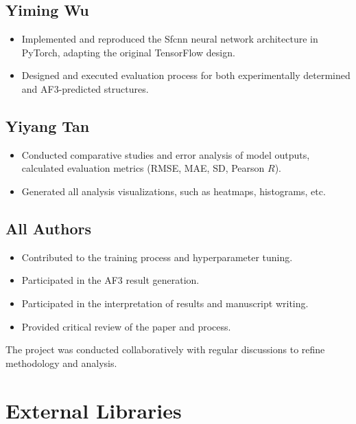 \documentclass[unnumsec,webpdf,contemporary,large]{oup-authoring-template}
\theoremstyle{thmstyleone}%
\theoremstyle{thmstyletwo}%
\theoremstyle{thmstylethree}%
\begin{document}
\subsection{Yiming Wu}
\begin{itemize}
    \item Implemented and reproduced the Sfcnn neural network architecture in PyTorch, adapting the original TensorFlow design.
    \item Designed and executed evaluation process for both experimentally determined and AF3-predicted structures.
\end{itemize}

\subsection{Yiyang Tan}
\begin{itemize}
    \item Conducted comparative studies and error analysis of model outputs, calculated evaluation metrics (RMSE, MAE, SD, Pearson $R$).
    \item Generated all analysis visualizations, such as heatmaps, histograms, etc.
\end{itemize}

\subsection{All Authors}
\begin{itemize}
    \item Contributed to the training process and hyperparameter tuning.
    \item Participated in the AF3 result generation.
    \item Participated in the interpretation of results and manuscript writing.
    \item Provided critical review of the paper and process.
\end{itemize}  

The project was conducted collaboratively with regular 
discussions to refine methodology and analysis.

\section{External Libraries}
\end{document}
